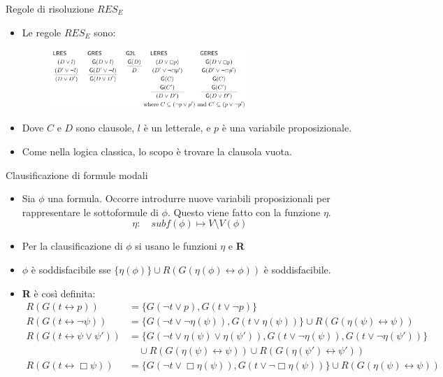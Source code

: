 \documentclass{beamer}
\newcommand{\tto} {\leftrightarrow}
\begin{document}
\begin{frame}{Regole di risoluzione $RES_E$}
    \begin{itemize}
        \item Le regole $RES_E$ sono:
        \begin{figure}
            \centering
            \includegraphics[width=0.7\textwidth, height=0.5\textheight]{assets/res_E.png}
        \end{figure} 
        \item Dove $C$ e $D$ sono clausole, $l$ è un letterale, e $p$ è una variabile proposizionale.
        \item Come nella logica classica, lo scopo è trovare la clausola vuota.
    \end{itemize}
\end{frame}

\begin{frame}{Clausificazione di formule modali}
    \begin{itemize}
        \item Sia $\phi$ una formula. Occorre introdurre nuove variabili proposizionali per rappresentare le sottoformule di $\phi$. Questo viene fatto con la funzione $\eta$.
        \[
            \eta: \quad subf(\phi) \mapsto V \setminus V(\phi)
        \]
            \item Per la clausificazione di $\phi$ si usano le funzioni $\eta$ e \textbf{R}
        \item $\phi$ è soddisfacibile sse $\{ \eta(\phi) \} \cup R(G(\eta(\phi) \tto \phi))$ è soddisfacibile.
        \item \textbf{R} è così definita:
        \[
            \begin{aligned}
            R(G(t \tto p)) &= \{ G(\lnot t \lor p), G(t \lor \lnot p) \} \\
            R(G(t \tto \lnot \psi)) &= \{ G(\lnot t \lor \lnot \eta(\psi)), G(t \lor \eta(\psi)) \} \cup R(G(\eta(\psi) \tto \psi)) \\
            R(G(t \tto \psi \lor \psi')) &= \{ G(\lnot t \lor \eta(\psi) \lor \eta(\psi')), G(t \lor \lnot \eta(\psi)), G(t \lor \lnot \eta(\psi')) \} \\
            & \quad \cup R(G(\eta(\psi) \tto \psi)) \cup R(G(\eta(\psi') \tto \psi')) \\
            R(G(t \tto \Box \psi)) &= \{ G(\lnot t \lor \Box \eta(\psi)), G(t \lor \lnot \Box \eta(\psi)) \} \cup R(G(\eta(\psi) \tto \psi))
            \end{aligned}
        \]
    \end{itemize}
\end{frame}
\end{document}
